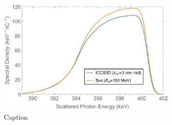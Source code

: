 \documentclass[../main.tex]{subfiles}
\begin{document}
\begin{figure}
\centering
\includegraphics[width=0.8\textwidth]{Figures/CBETA_Inverse_Compton_Source_Design/150MeVBenchmarkSpectra.pdf}
\caption{Caption}
\label{fig:CBETA_Benchmarking_Spectra}
\end{figure}
\end{document}
